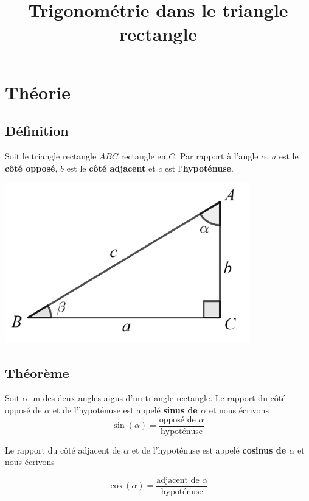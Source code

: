 \documentclass[a4paper,11pt]{article}
\begin{document}
\title{Trigonométrie dans le triangle rectangle}
\date{}
\maketitle

\section{Théorie}
\subsection{Définition}
\begin{multicols}{2}
Soit le triangle rectangle $ABC$ rectangle en $C$. Par rapport à l'angle $\alpha$, $a$ est le \textbf{côté opposé}, $b$ est le \textbf{côté adjacent} et $c$ est l'\textbf{hypoténuse}.\\
\begin{center}
\includegraphics[width=0.8\textwidth]{images/trianglerect.png}\\
\end{center}
\end{multicols}

\subsection{Théorème}
Soit $\alpha$ un des deux angles aigus d'un triangle rectangle. Le rapport du côté opposé de $\alpha$ et de l'hypoténuse est appelé \textbf{sinus de $\alpha$} et nous écrivons
$$\sin(\alpha)=\frac{\text{opposé de }\alpha}{\text{hypoténuse}}$$

Le rapport du côté adjacent de $\alpha$ et de l'hypoténuse est appelé \textbf{cosinus de $\alpha$} et nous écrivons

$$\cos(\alpha)=\frac{\text{adjacent de }\alpha}{\text{hypoténuse}}$$
\end{document}
